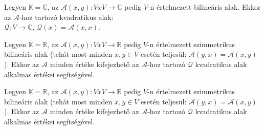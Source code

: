 \begin{frame}
		\begin{tcolorbox}[title={Def.: Kvadratikus alak}]
			Legyen $\mathbb{K}  = \mathbb{C}$, az $\mathcal{A}(x, y) : V x V \rightarrow \mathbb{C}$ pedig $V$-n értelmezett bilineáris alak. Ekkor az $\mathcal{A}$-hoz tartozó kvadratikus alak:\\
			
			$\mathcal{Q} : V \rightarrow \mathbb{C}$, $\mathcal{Q}(x) = \mathcal{A}(x, x)$.
		\end{tcolorbox}	
		
		\begin{tcolorbox}[title={Tétel: Szimmetrikus bilineáris alak, kvadratikus alak}]
			Legyen $\mathbb{K}  = \mathbb{R}$, az $\mathcal{A}(x, y) : V x V \rightarrow \mathbb{R}$ pedig $V$-n értelmezett szimmetrikus bilineáris alak (tehát most minden $x, y \in V$ esetén teljesül: $\mathcal{A}(y, x) = \mathcal{A}(x, y)$). Ekkor az $\mathcal{A}$ minden értéke kifejezhető az $\mathcal{A}$-hoz tartozó $\mathcal{Q}$ kvadratikus alak alkalmas értékei segítségével.
		\end{tcolorbox}	
	\end{frame}
		
	\begin{frame}
		\begin{tcolorbox}[title={Tétel: Szimmetrikus bilineáris alak, kvadratikus alak}]
			Legyen $\mathbb{K}  = \mathbb{R}$, az $\mathcal{A}(x, y) : V x V \rightarrow \mathbb{R}$ pedig $V$-n értelmezett szimmetrikus bilineáris alak (tehát most minden $x, y \in V$ esetén teljesül: $\mathcal{A}(y, x) = \mathcal{A}(x, y)$). Ekkor az $\mathcal{A}$ minden értéke kifejezhető az $\mathcal{A}$-hoz tartozó $\mathcal{Q}$ kvadratikus alak alkalmas értékei segítségével.
		\end{tcolorbox}	
	\end{frame}
	
	\begin{comment}
	\begin{frame}
		\begin{tcolorbox}[title={Bázistranzformáció}]
			Kérdés: Hány dimenziós?\\
			
			 \begin{center}
			\begin{tabular}{ c|c c c c } 
			 \hline
			  & a & b & c & d \\ 
			 ${e_1}$ & 3 & 9 & 1 & 5 \\ 
			 ${e_2}$ & 2 & 10 & 2 & 2 \\ 
			 ${e_3}$ & -1 & 1 & 1 & -3 \\ 
			 ${e_4}$ & 0 & -3 & -1 & 1 \\ 
			 ${e_5}$ & 1 & 2 & 0 & 2 \\ 
			 \hline
			\end{tabular}
			\end{center}
			\mmedskip
			
			asd
		\end{tcolorbox}
	\end{frame}
	\end{comment}

